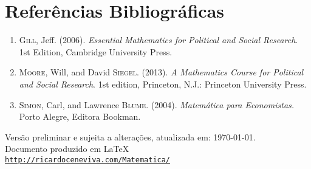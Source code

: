 \documentclass[a4paper, 12pt]{article}
\def\footerlink{http://ricardoceneviva.com/Matematica/}
\begin{document}
\section*{Referências Bibliográficas}
\begin{enumerate}

\item \textsc{Gill}, Jeff. (2006). \emph{Essential Mathematics for Political and Social Research}. 1st Edition, Cambridge University Press.

\vspace{0.5cm}

\item \textsc{Moore}, Will, and David \textsc{Siegel}. (2013). \emph{A Mathematics Course for Political and Social Research}. 1st edition, Princeton, N.J.: Princeton University Press.

\vspace{0.5cm}

\item \textsc{Simon}, Carl, and Lawrence \textsc{Blume}. (2004). \emph{Matemática para Economistas.} Porto Alegre, Editora Bookman. 

\end{enumerate}



 
\vspace{1cm}

\begin{center}
  \begin{footnotesize}
    Versão preliminar e sujeita a  alterações, atualizada em: \today. \\
    Documento produzido em \LaTeX  \\
    
    \href{\footerlink}{\texttt{\footerlink}}
  \end{footnotesize}
\end{center}
\end{document}
